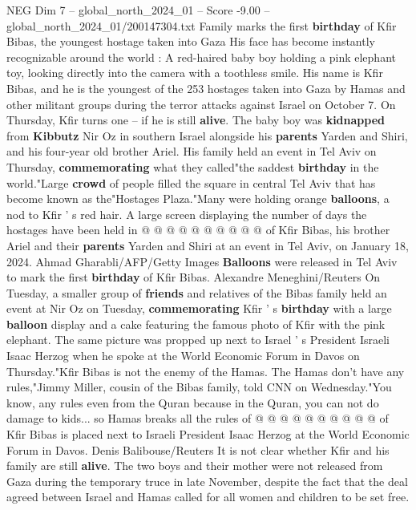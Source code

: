 \begin{textsample}{NEG Dim 7 – global\_north\_2024\_01 – Score -9.00 – global\_north\_2024\_01/200147304.txt}  \label{ex:f7_neg_204}
Family marks the first \textbf{birthday} of Kfir Bibas, the youngest hostage taken into Gaza His face has become instantly recognizable around the world : A red-haired baby boy holding a pink elephant toy, looking directly into the camera with a toothless smile.
His name is Kfir Bibas, and he is the youngest of the 253 hostages taken into Gaza by Hamas and other militant groups during the terror attacks against Israel on October 7.
On Thursday, Kfir turns one -- if he is still \textbf{alive}.
The baby boy was \textbf{kidnapped} from \textbf{Kibbutz} Nir Oz in southern Israel alongside his \textbf{parents} Yarden and Shiri, and his four-year old brother Ariel.
His family held an event in Tel Aviv on Thursday, \textbf{commemorating} what they called"the saddest \textbf{birthday} in the world."Large \textbf{crowd} of people filled the square in central Tel Aviv that has become known as the"Hostages Plaza."Many were holding orange \textbf{balloons}, a nod to Kfir ' s red hair.
A large screen displaying the number of days the hostages have been held in @ @ @ @ @ @ @ @ @ @ of Kfir Bibas, his brother Ariel and their \textbf{parents} Yarden and Shiri at an event in Tel Aviv, on January 18, 2024.
Ahmad Gharabli/AFP/Getty Images \textbf{Balloons} were released in Tel Aviv to mark the first \textbf{birthday} of Kfir Bibas.
Alexandre Meneghini/Reuters On Tuesday, a smaller group of \textbf{friends} and relatives of the Bibas family held an event at Nir Oz on Tuesday, \textbf{commemorating} Kfir ' s \textbf{birthday} with a large \textbf{balloon} display and a cake featuring the famous photo of Kfir with the pink elephant.
The same picture was propped up next to Israel ' s President Israeli Isaac Herzog when he spoke at the World Economic Forum in Davos on Thursday."Kfir Bibas is not the enemy of the Hamas.
The Hamas don't have any rules,"Jimmy Miller, cousin of the Bibas family, told CNN on Wednesday."You know, any rules even from the Quran because in the Quran, you can not do damage to kids... so Hamas breaks all the rules of @ @ @ @ @ @ @ @ @ @ of Kfir Bibas is placed next to Israeli President Isaac Herzog at the World Economic Forum in Davos.
Denis Balibouse/Reuters It is not clear whether Kfir and his family are still \textbf{alive}.
The two boys and their mother were not released from Gaza during the temporary truce in late November, despite the fact that the deal agreed between Israel and Hamas called for all women and children to be set free.

\end{textsample}
